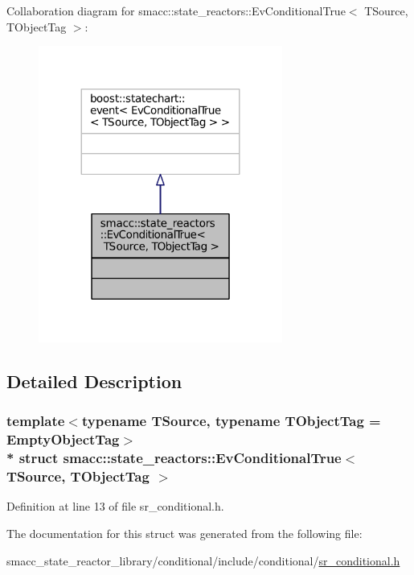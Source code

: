 Collaboration diagram for smacc\+:\+:state\+\_\+reactors\+:\+:Ev\+Conditional\+True$<$ T\+Source, T\+Object\+Tag $>$\+:
\nopagebreak
\begin{figure}[H]
\begin{center}
\leavevmode
\includegraphics[width=227pt]{structsmacc_1_1state__reactors_1_1EvConditionalTrue__coll__graph}
\end{center}
\end{figure}


\subsection{Detailed Description}
\subsubsection*{template$<$typename T\+Source, typename T\+Object\+Tag = Empty\+Object\+Tag$>$\\*
struct smacc\+::state\+\_\+reactors\+::\+Ev\+Conditional\+True$<$ T\+Source, T\+Object\+Tag $>$}



Definition at line 13 of file sr\+\_\+conditional.\+h.



The documentation for this struct was generated from the following file\+:\begin{DoxyCompactItemize}
\item 
smacc\+\_\+state\+\_\+reactor\+\_\+library/conditional/include/conditional/\hyperlink{sr__conditional_8h}{sr\+\_\+conditional.\+h}\end{DoxyCompactItemize}
